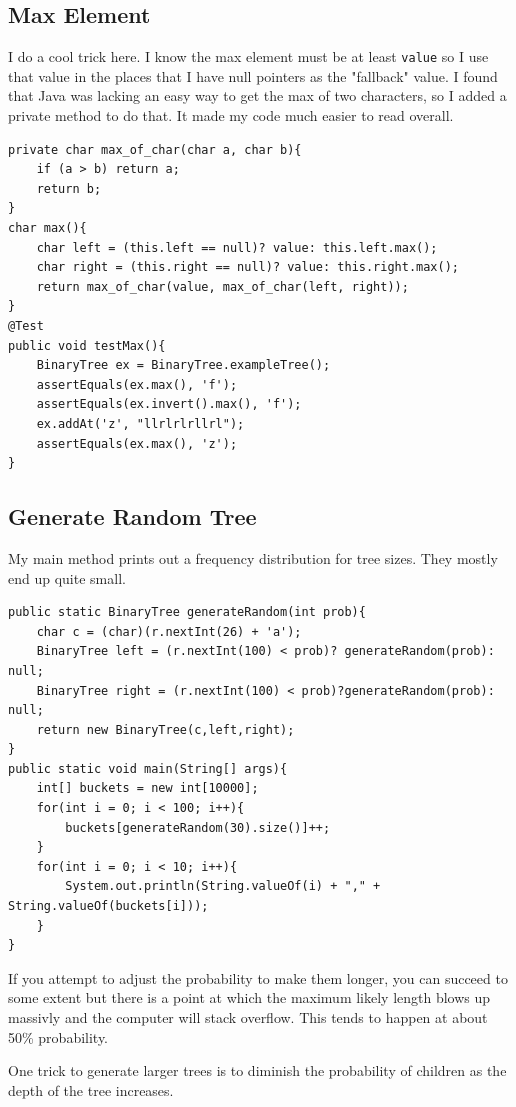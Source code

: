 \documentclass[twoside=false,DIV=14]{scrartcl}
\begin{document}
\subsection{Max Element}
I do a cool trick here.  I know the max element must be at least \verb+value+ so I use that value in the places that I have null pointers as the "fallback" value.  I found that Java was lacking an easy way to get the max of two characters, so I added a private method to do that.  It made my code much easier to read overall.
\begin{lstlisting}
private char max_of_char(char a, char b){
    if (a > b) return a;
    return b;
}
char max(){
    char left = (this.left == null)? value: this.left.max();
    char right = (this.right == null)? value: this.right.max();
    return max_of_char(value, max_of_char(left, right));
}
@Test
public void testMax(){
    BinaryTree ex = BinaryTree.exampleTree();
    assertEquals(ex.max(), 'f');
    assertEquals(ex.invert().max(), 'f');
    ex.addAt('z', "llrlrlrllrl");
    assertEquals(ex.max(), 'z');
}    
\end{lstlisting}

\subsection{Generate Random Tree}
My main method prints out a frequency distribution for tree sizes.  They mostly end up quite small.
\begin{lstlisting}
public static BinaryTree generateRandom(int prob){
    char c = (char)(r.nextInt(26) + 'a');
    BinaryTree left = (r.nextInt(100) < prob)? generateRandom(prob): null;
    BinaryTree right = (r.nextInt(100) < prob)?generateRandom(prob): null;
    return new BinaryTree(c,left,right);
}
public static void main(String[] args){
    int[] buckets = new int[10000];
    for(int i = 0; i < 100; i++){
        buckets[generateRandom(30).size()]++;
    }
    for(int i = 0; i < 10; i++){
        System.out.println(String.valueOf(i) + "," + String.valueOf(buckets[i]));
    }
}
\end{lstlisting}

If you attempt to adjust the probability to make them longer, you can succeed to some extent but there is a point at which the maximum likely length blows up massivly and the computer will stack overflow.  This tends to happen at about 50\% probability.

One trick to generate larger trees is to diminish the probability of children as the depth of the tree increases.
\end{document}
